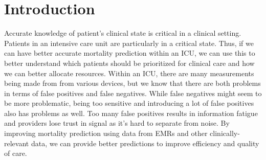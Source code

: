 \documentclass[12pt, final]{article}
\renewcommand{\thefootnote}{$\star$}
\begin{document}
\newpage
\renewcommand{\thefootnote}{\number\value{footnote}} 
\section{Introduction} \label{Introduction}
Accurate knowledge of patient's clinical state is critical in a clinical setting. Patients in an intensive care unit are particularly in a critical state. Thus, if we can have better accurate mortality prediction within an ICU, we can use this to better understand which patients should be prioritized for clinical care and how we can better allocate resources. Within an ICU, there are many measurements being made from from various devices, but we know that there are both problems in terms of false positives and false negatives. While false negatives might seem to be more problematic, being too sensitive and introducing a lot of false positives also has problems as well. Too many false positives results in information fatigue and providers lose trust in signal as it's hard to separate from noise. By improving mortality prediction using data from EMRs and other clinically-relevant data, we can provide better predictions to improve efficiency and quality of care.
\end{document}
